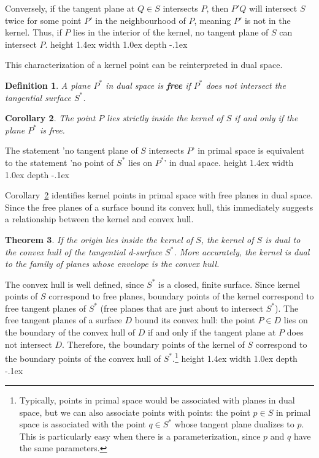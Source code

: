 \documentclass[12pt]{article}
\newcommand{\QED}{\vrule height 1.4ex width 1.0ex depth -.1ex\ \vspace{.3in}} %
\newcommand{\prf}{\noindent{{\bf Proof}:\ \ \ }}
\newtheorem{theorem}{Theorem}
\newtheorem{corollary}[theorem]{Corollary}
\newtheorem{defn2}[theorem]{Definition}
\begin{document}
Conversely, if the tangent plane at $Q \in S$ intersects $P$, then $P'Q$ will intersect $S$ twice for some point $P'$ in 
the neighbourhood of $P$, meaning $P'$ is not in the kernel.
Thus, if $P$ lies in the interior of the kernel, no tangent plane of $S$ can intersect $P$.
\QED

\noindent This characterization of a kernel point can be reinterpreted in dual space.

\begin{defn2}
A plane $P^*$ in dual space is {\bf free} if $P^*$ does not intersect the tangential surface $S^*$.
\end{defn2}

\begin{corollary}
\label{cor:dualkernelchar}
The point $P$ lies strictly inside the kernel of $S$ if and only if 
the plane $P^*$ is free.
\end{corollary}
\prf
The statement 'no tangent plane of $S$ intersects $P$' in primal space
is equivalent to the statement 'no point of $S^*$ lies on $P^*$' in dual space.
\QED

Corollary~\ref{cor:dualkernelchar} identifies kernel points in primal space
with free planes in dual space.
Since the free planes of a surface bound its convex hull,
this immediately suggests a relationship between the kernel and convex hull.

\begin{theorem}
\label{thm:kernelhull}
If the origin lies inside the kernel of $S$,
the kernel of $S$ is dual to the convex hull of the tangential d-surface $S^*$.
More accurately, the kernel is dual to the family of planes whose
envelope is the convex hull.
\end{theorem}
\prf
The convex hull is well defined, since $S^*$ is a closed, finite surface.
Since kernel points of $S$ correspond to free planes,
boundary points of the kernel correspond to free tangent planes of $S^*$
(free planes that are just about to intersect $S^*$).
The free tangent planes of a surface $D$ bound its convex hull: the point $P \in D$ lies
on the boundary of the convex hull of $D$ if and only if the tangent plane at $P$ 
does not intersect $D$.
Therefore, the boundary points of the kernel of $S$ correspond to the boundary points
of the convex hull of $S^*$.\footnote{Typically, points in primal space would be associated with planes in dual space,
	but we can also associate points with points:
	the point $p \in S$ in primal space is associated
	with the point $q \in S^*$ whose tangent plane dualizes to $p$.
	This is particularly easy when there is a parameterization, since $p$ and $q$ 
	have the same parameters.}
\QED
\end{document}
